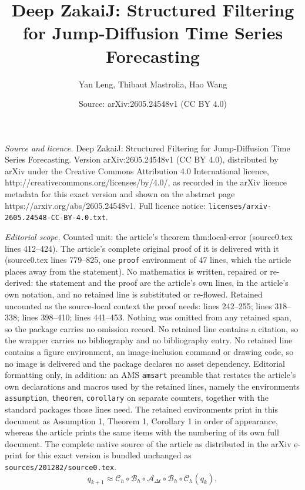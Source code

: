 \documentclass[10pt,a4paper]{amsart}
\title{Deep ZakaiJ: Structured Filtering for Jump-Diffusion Time Series Forecasting}
\author{Yan Leng, Thibaut Mastrolia, Hao Wang}
\date{Source: arXiv:2605.24548v1 (CC BY 4.0)}
\begin{document}
\maketitle

\noindent\emph{Source and licence.} Deep ZakaiJ: Structured Filtering for Jump-Diffusion Time Series Forecasting. Version arXiv:2605.24548v1 (CC BY 4.0), distributed by arXiv under the Creative Commons Attribution 4.0 International licence, http://creativecommons.org/licenses/by/4.0/, as recorded in the arXiv licence metadata for this exact version and shown on the abstract page https://arxiv.org/abs/2605.24548v1. Full licence notice: \texttt{licenses/arxiv-2605.24548-CC-BY-4.0.txt}.\par\smallskip

\noindent\textit{Editorial scope.} Counted unit: the article's theorem thm:local-error (source0.tex lines 412--424). The article's complete original proof of it is delivered with it (source0.tex lines 779--825, one \texttt{proof} environment of 47 lines, which the article places away from the statement). No mathematics is written, repaired or re-derived: the statement and the proof are the article's own lines, in the article's own notation, and no retained line is substituted or re-flowed.  Retained uncounted as the source-local context the proof needs: lines 242--255; lines 318--338; lines 398--410; lines 441--453.  Nothing was omitted from any retained span, so the package carries no omission record.  No retained line contains a citation, so the wrapper carries no bibliography and no bibliography entry.  No retained line contains a figure environment, an image-inclusion command or drawing code, so no image is delivered and the package declares no asset dependency.  Editorial formatting only, in addition: an AMS \texttt{amsart} preamble that restates the article's own declarations and macros used by the retained lines, namely the environments \texttt{assumption}, \texttt{theorem}, \texttt{corollary} on separate counters, together with the standard packages those lines need.  The retained environments print in this document as Assumption 1, Theorem 1, Corollary 1 in order of appearance, whereas the article prints the same items with the numbering of its own full document.  The complete native source of the article as distributed in the arXiv e-print for this exact version is bundled unchanged as \texttt{sources/201282/source0.tex}.
\begin{equation}
q_{k+1}
\approx
\mathcal{C}_{h}
\circ
\mathcal{B}_{h}
\circ
\mathcal{A}_{\Delta t}
\circ
\mathcal{B}_{h}
\circ
\mathcal{C}_{h}(q_k),
\label{eq:strang-update}
\end{equation}
\end{document}
